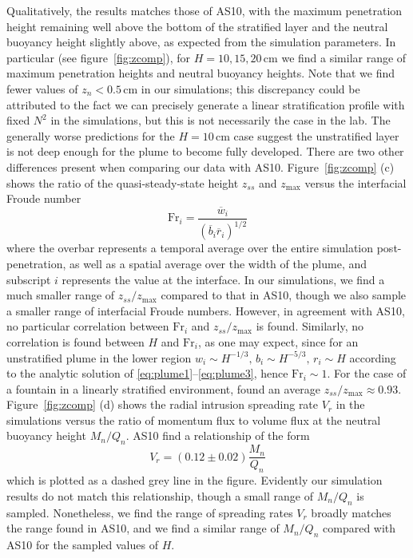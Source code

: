 \documentclass[a4paper]{article}
\begin{document}
Qualitatively, the results matches those of AS10, with the maximum penetration height remaining well above the
bottom of the stratified layer and the neutral buoyancy height slightly above, as expected from the simulation
parameters. In particular (see figure~\ref{fig:zcomp}), for $H = 10, 15, 20 \,\mathrm{cm}$ we find a similar
range of  maximum penetration heights and neutral buoyancy heights. Note that we find fewer values of $z_n <
0.5 \,\mathrm{cm}$ in our simulations; this discrepancy could be attributed to the fact we can precisely
generate a linear stratification profile with fixed $N^2$ in the simulations, but this is not necessarily the
case in the lab. The generally worse predictions for the $H = 10 \, \mathrm{cm}$ case suggest the unstratified
layer is not deep enough for the plume to become fully developed. There are two other differences present when
comparing our data with AS10.  Figure~\ref{fig:zcomp} (c) shows the ratio of the quasi-steady-state height
$z_{ss}$ and $z_{\max}$ versus the interfacial Froude number
\begin{equation}
	\mathrm{Fr}_i = \frac{\overline{w}_i}{\left( \overline{b}_i \overline{r}_i\right)^{1/2}}
\end{equation}
where the overbar represents a temporal average over the entire simulation post-penetration, as well as a
spatial average over the width of the plume, and subscript $i$ represents the value at the
interface. In our simulations, we find a much smaller range of $z_{ss}/z_{\max}$ compared to that in AS10,
though we also sample a smaller range of interfacial Froude numbers. However, in agreement with AS10, no
particular correlation between $\mathrm{Fr}_i$ and $z_{ss}/z_{\max}$ is found. Similarly, no correlation is
found between $H$ and $\mathrm{Fr}_i$, as one may expect, since for an unstratified plume in the lower region
$w_i \sim H^{-1/3}, \, b_i \sim H^{-5/3}, \, r_i \sim H$ according to the analytic solution of
\eqref{eq:plume1}--\eqref{eq:plume3}, hence $\mathrm{Fr}_i \sim 1$. For the case of a fountain in a linearly
stratified environment, \citet{bloomfield1998} found an average $z_{ss}/z_{\max} \approx 0.93$.
Figure~\ref{fig:zcomp} (d) shows the radial intrusion spreading rate $V_r$ in the simulations versus the ratio
of momentum flux to volume flux at the neutral buoyancy height $M_n/Q_n$. AS10 find a relationship of the form
\begin{equation}
	V_r = (0.12 \pm 0.02) \frac{M_n}{Q_n}
\end{equation}
which is plotted as a dashed grey line in the figure. Evidently our simulation results do not match this
relationship, though a small range of $M_n/Q_n$ is sampled. Nonetheless, we find the range of spreading rates
$V_r$ broadly matches the range found in AS10, and we find a similar range of $M_n/Q_n$ compared with AS10 for
the sampled values of $H$. 
\end{document}
